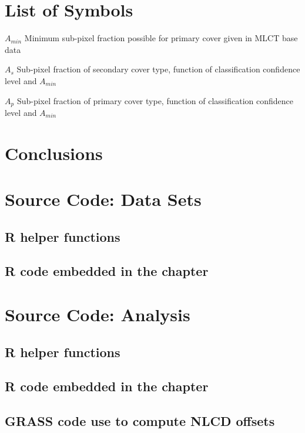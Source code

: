 \documentclass[draftthesis]{neiuthesis}
\begin{document}
\chapter{List of Symbols}

\begin{symbollist}[0.7in]
\item[$A_{min}$] Minimum sub-pixel fraction possible for primary cover
  given in MLCT base data
\item[$A_s$] Sub-pixel fraction of secondary cover type, function of
  classification confidence level and $A_{min}$
\item[$A_p$] Sub-pixel fraction of primary cover type, function of
  classification confidence level and $A_{min}$
\end{symbollist}

\mainmatter

\todototoc
\listoftodos





\chapter{Conclusions}




\backmatter



\appendix

\chapter{Source Code: Data Sets}
\section{R helper functions}

\section{R code embedded in the chapter}

\chapter{Source Code: Analysis}
\section{R helper functions}

\section{R code embedded in the chapter}

\section{GRASS code use to compute NLCD offsets}

\end{document}
